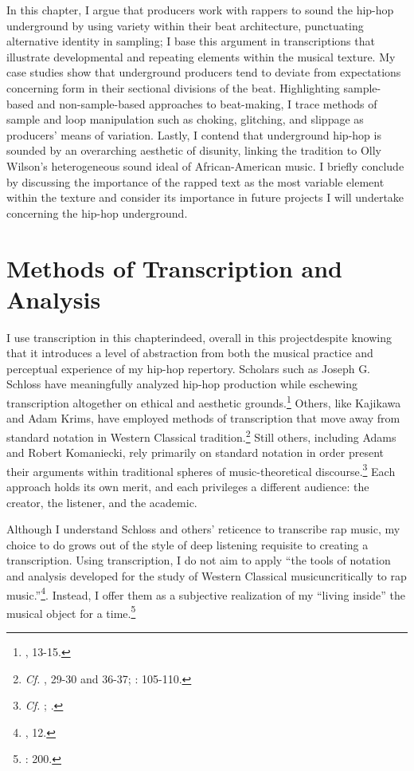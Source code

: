 In this chapter, I argue that producers work with rappers to sound the hip-hop underground by using variety within their beat architecture, punctuating alternative identity in sampling; I base this argument in transcriptions that illustrate developmental and repeating elements within the musical texture. My case studies show that underground producers tend to deviate from expectations concerning form in their sectional divisions of the beat. Highlighting sample-based and non-sample-based approaches to beat-making, I trace methods of sample and loop manipulation such as choking, glitching, and slippage as producers' means of variation. Lastly, I contend that underground hip-hop is sounded by an overarching aesthetic of disunity, linking the tradition to Olly Wilson's heterogeneous sound ideal of African-American music. I briefly conclude by discussing the importance of the rapped text as the most variable element within the texture and consider its importance in future projects I will undertake concerning the hip-hop underground.

\section{Methods of Transcription and Analysis}
I use transcription in this chapter\textemdash indeed, overall in this project\textemdash despite knowing that it introduces a level of abstraction from both the musical practice and perceptual experience of my hip-hop repertory. Scholars such as Joseph G. Schloss have meaningfully analyzed hip-hop production while eschewing transcription altogether on ethical and aesthetic grounds.\footnote{\cite{josephgschlossMakingBeatsArt2004}, 13-15.} Others, like Kajikawa and Adam Krims, have employed methods of transcription that move away from standard notation in Western Classical tradition.\footnote{\textit{Cf.} \cite{lorenkajikawaSoundingRaceRap2015}, 29-30 and 36-37; \cite{adamkrimsRapMusicPoetics2000}: 105-110.} Still others, including Adams and Robert Komaniecki, rely primarily on standard notation in order present their arguments within traditional spheres of music-theoretical discourse.\footnote{\textit{Cf. }\cite{kyleadamsMetricalTechniquesFlow2009}; \cite{robertkomanieckiAnalyzingCollaborativeFlow2017}.} Each approach holds its own merit, and each privileges a different audience: the creator, the listener, and the academic.

Although I understand Schloss and others' reticence to transcribe rap music, my choice to do grows out of the style of deep listening requisite to creating a transcription. Using transcription, I do not aim to apply ``the tools of notation and analysis developed for the study of Western Classical music\textellipsis uncritically to rap music.''\footnote{\cite{lorenkajikawaSoundingRaceRap2015}, 12.}. Instead, I offer them as a subjective realization of my ``living inside'' the musical object for a time.\footnote{\cite{peterwinklerWritingGhostNotes1997}: 200.} 

